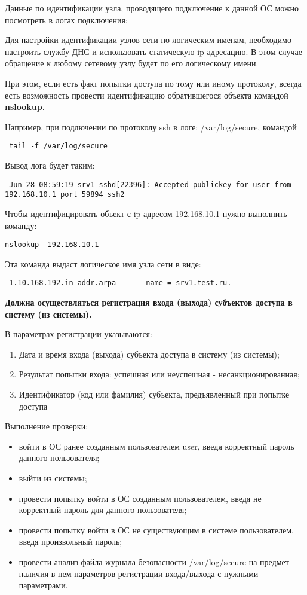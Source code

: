 \documentclass[a4paper,10pt,twoside]{article}
\begin{document}
Данные по идентификации узла, проводящего подключение к данной ОС можно посмотреть  в логах подключения:

Для настройки идентификации узлов сети по логическим именам, необходимо настроить службу ДНС и использовать статическую ip адресацию. В этом случае обращение к любому сетевому узлу будет по его логическому имени.

При этом, если есть факт попытки доступа по тому или иному протоколу, всегда есть возможность провести идентификацию обратившегося объекта командой 
\textbf{nslookup}.

Например, при подлючении по протоколу ssh в логе: /var/log/secure, командой
\begin{verbatim}
 tail -f /var/log/secure
\end{verbatim} 

Вывод лога будет таким:
\begin{verbatim}
 Jun 28 08:59:19 srv1 sshd[22396]: Accepted publickey for user from 192.168.10.1 port 59894 ssh2
\end{verbatim} 

Чтобы идентифицировать объект с ip адресом  192.168.10.1 нужно выполнить команду:
\begin{verbatim}
nslookup  192.168.10.1
\end{verbatim} 

Эта команда выдаст логическое имя узла сети в виде:
\begin{verbatim}
 1.10.168.192.in-addr.arpa       name = srv1.test.ru.
\end{verbatim} 

 \textbf{Должна осуществляться регистрация входа (выхода) субъектов доступа в систему (из системы).}

В параметрах регистрации указываются:
\begin{enumerate}
\item Дата и время входа (выхода) субъекта доступа в систему (из системы);
\item Результат попытки входа: успешная или неуспешная - несанкционированная;
\item Идентификатор (код или фамилия) субъекта, предъявленный при попытке доступа
\end{enumerate}


Выполнение проверки:

\begin{itemize}
\item войти в ОС ранее  созданным пользователем user, введя корректный пароль данного пользователя;
\item выйти из системы;
\item провести попытку войти в ОС созданным пользователем, введя не корректный пароль для данного пользователя;
\item провести попытку войти в ОС не существующим в системе пользователем, введя произвольный пароль;
\item провести анализ файла журнала безопасности /var/log/secure на предмет наличия в нем параметров регистрации входа/выхода с нужными параметрами.\end{itemize}
\end{document}

